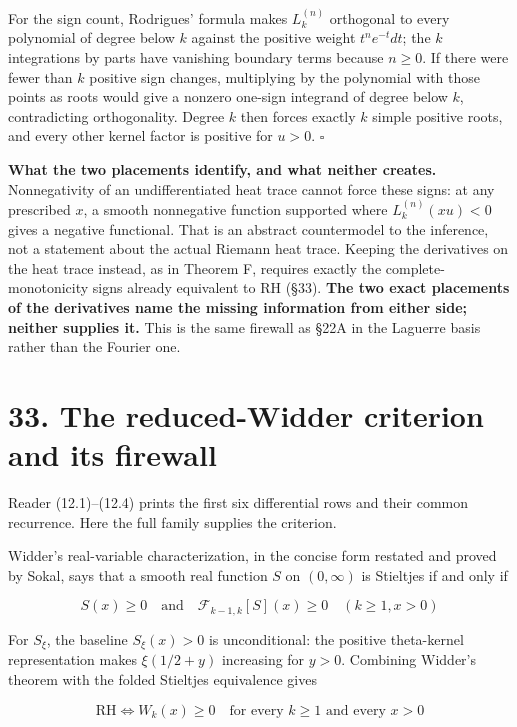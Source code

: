 \documentclass[
  11pt,
]{book}
\begin{document}
For the sign count, Rodrigues' formula makes \(L_k^{(n)}\) orthogonal to
every polynomial of degree below \(k\) against the positive weight
\(t^ne^{-t}dt\); the \(k\) integrations by parts have vanishing boundary
terms because \(n\ge0\). If there were fewer than \(k\) positive sign
changes, multiplying by the polynomial with those points as roots would
give a nonzero one-sign integrand of degree below \(k\), contradicting
orthogonality. Degree \(k\) then forces exactly \(k\) simple positive
roots, and every other kernel factor is positive for \(u>0\).
\(\square\)

\textbf{What the two placements identify, and what neither creates.}
Nonnegativity of an undifferentiated heat trace cannot force these
signs: at any prescribed \(x\), a smooth nonnegative function supported
where \(L_k^{(n)}(xu)<0\) gives a negative functional. That is an
abstract countermodel to the inference, not a statement about the actual
Riemann heat trace. Keeping the derivatives on the heat trace instead,
as in Theorem F, requires exactly the complete-monotonicity signs
already equivalent to RH (§33). \textbf{The two exact placements of the
derivatives name the missing information from either side; neither
supplies it.} This is the same firewall as §22A in the Laguerre basis
rather than the Fourier one.

\section{33. The reduced-Widder criterion and its
firewall}\label{the-reduced-widder-criterion-and-its-firewall}

Reader (12.1)--(12.4) prints the first six differential rows and their
common recurrence. Here the full family supplies the criterion.

Widder's real-variable characterization, in the concise form restated
and proved by Sokal, says that a smooth real function \(S\) on
\((0,\infty)\) is Stieltjes if and only if

\[
S(x)\ge0
\quad\text{and}\quad
\mathcal F_{k-1,k}[S](x)\ge0
\quad(k\ge1, x>0)
\]

For \(S_\xi\), the baseline \(S_\xi(x)>0\) is unconditional: the
positive theta-kernel representation makes \(\xi(1/2+y)\) increasing for
\(y>0\). Combining Widder's theorem with the folded Stieltjes
equivalence gives

\[
\boxed{
\mathrm{RH}
\iff
W_k(x)\ge0
\quad\text{for every }k\ge1\text{ and every }x>0
}
\tag{33.1}
\]
\end{document}
